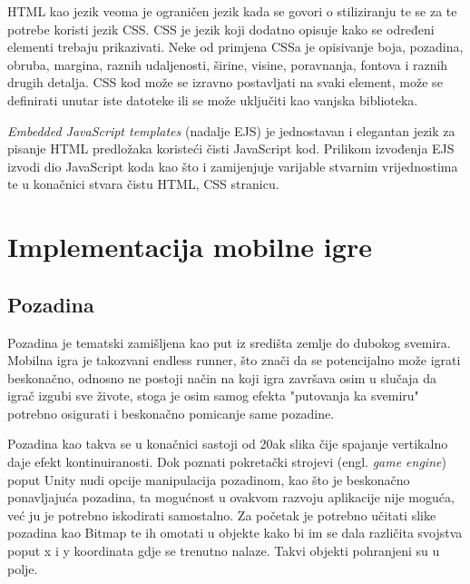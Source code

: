 \documentclass[times, utf8, zavrsni, numeric]{fer}
\begin{document}
	HTML kao jezik veoma je ograničen jezik kada se govori o stiliziranju te se za te potrebe koristi jezik CSS. CSS je jezik koji dodatno opisuje kako se određeni elementi trebaju prikazivati. Neke od primjena CSSa je opisivanje boja, pozadina, obruba,
	margina, raznih udaljenosti, širine, visine, poravnanja, fontova i raznih drugih detalja. CSS kod može se izravno postavljati na svaki element, može se definirati unutar iste datoteke ili se može uključiti kao vanjska biblioteka. 
	
	\textit{Embedded JavaScript templates} (nadalje EJS) je jednostavan i elegantan jezik za pisanje HTML predložaka koristeći čisti JavaScript kod. Prilikom izvođenja EJS izvodi dio JavaScript koda kao što i zamijenjuje varijable stvarnim vrijednostima te
	u konačnici stvara čistu HTML, CSS stranicu.
	

	

\chapter{Implementacija mobilne igre}

	\section{Pozadina}
	Pozadina je tematski zamišljena kao put iz središta zemlje  do dubokog svemira. Mobilna igra je takozvani endless runner, što znači da se potencijalno može igrati beskonačno,
	odnosno ne postoji način na koji igra završava osim u slučaja da igrač izgubi sve živote, stoga je osim samog efekta "putovanja ka svemiru" potrebno osigurati i beskonačno pomicanje same pozadine.
	
	Pozadina kao takva se u konačnici sastoji od 20ak slika čije spajanje vertikalno daje efekt kontinuiranosti. Dok poznati pokretački strojevi (engl. \textit{game engine}) poput Unity nudi opcije manipulacija
	pozadinom, kao što je beskonačno ponavljajuća pozadina, ta mogućnost u ovakvom razvoju aplikacije nije moguća, već ju je potrebno iskodirati samostalno. 
	Za početak je potrebno učitati slike pozadina kao Bitmap te ih omotati u objekte kako bi im se dala različita svojstva poput x i y koordinata gdje se trenutno nalaze. Takvi objekti pohranjeni su u polje.
	
\end{document}
